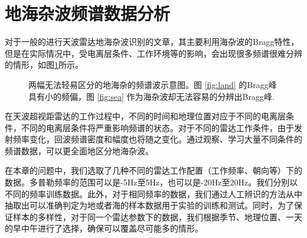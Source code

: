 \section{地海杂波频谱数据分析}
对于一般的进行天波雷达地海杂波识别的文章，其主要利用海杂波的Bragg特性，但是在实际情况中，受电离层条件、工作环境等的影响，会出现很多频谱很难分辨的情形，如图\ref{fig:spectrum}所示。
\begin{figure}[H]
	\centering
	\hfil
	\caption{两幅无法轻易区分的地海杂的频谱波示意图。图 \ref{fig:land} 的Bragg峰具有小的频偏，图 \ref{fig:sea} 作为海杂波却无法容易的分辨出Bragg峰.}
	\label{fig:spectrum}
\end{figure}
在天波超视距雷达的工作过程中，不同的时间和地理位置对应于不同的电离层条件，不同的电离层条件将严重影响频谱的状态。对于不同的雷达工作条件，由于发射频率变化，回波频谱密度和幅度也将随之变化。通过观察、学习大量不同条件的频谱数据，可以更全面地区分地海杂波。

在本章的问题中，我们选取了几种不同的雷达工作配置（工作频率、朝向等）下的数据。多普勒频率的范围可以是-5Hz至5Hz，也可以是-20Hz至20Hz。我们分别以不同的频率训练数据。此外，对于相同频率的数据，我们通过人工辨识的方法从中抽取出可以准确判定为地或者海的样本数据用于实验的训练和测试。同时，为了保证样本的多样性，对于同一个雷达参数下的数据，我们根据季节、地理位置、一天的早中午进行了选择，确保可以覆盖尽可能多的情形。

